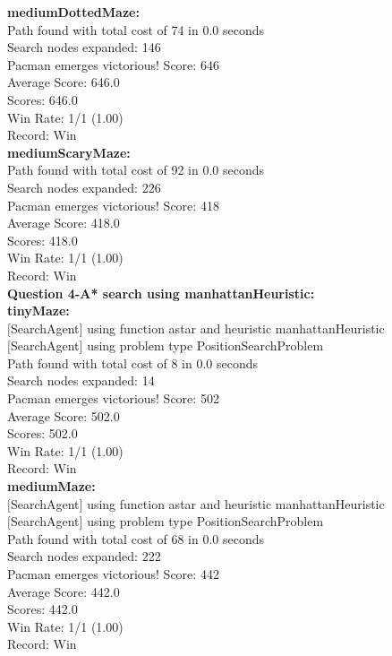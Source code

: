 \documentclass[11pt]{article}
\begin{document}
\noindent
\textbf{mediumDottedMaze:}\\
Path found with total cost of 74 in 0.0 seconds\\
Search nodes expanded: 146\\
Pacman emerges victorious! Score: 646\\
Average Score: 646.0\\
Scores:        646.0\\
Win Rate:      1/1 (1.00)\\
Record:        Win\\

\noindent
\textbf{mediumScaryMaze:}\\
Path found with total cost of 92 in 0.0 seconds\\
Search nodes expanded: 226\\
Pacman emerges victorious! Score: 418\\
Average Score: 418.0\\
Scores:        418.0\\
Win Rate:      1/1 (1.00)\\
Record:        Win\\


\newpage
\noindent
\textbf{Question 4-A* search using manhattanHeuristic:}\\
\textbf{tinyMaze:}\\
$[$SearchAgent$]$ using function astar and heuristic manhattanHeuristic\\
$[$SearchAgent$]$ using problem type PositionSearchProblem\\
Path found with total cost of 8 in 0.0 seconds\\
Search nodes expanded: 14\\
Pacman emerges victorious! Score: 502\\
Average Score: 502.0\\
Scores:        502.0\\
Win Rate:      1/1 (1.00)\\
Record:        Win\\

\noindent
\textbf{mediumMaze:}\\
$[$SearchAgent$]$ using function astar and heuristic manhattanHeuristic\\
$[$SearchAgent$]$ using problem type PositionSearchProblem\\
Path found with total cost of 68 in 0.0 seconds\\
Search nodes expanded: 222\\
Pacman emerges victorious! Score: 442\\
Average Score: 442.0\\
Scores:        442.0\\
Win Rate:      1/1 (1.00)\\
Record:        Win\\
\end{document}
